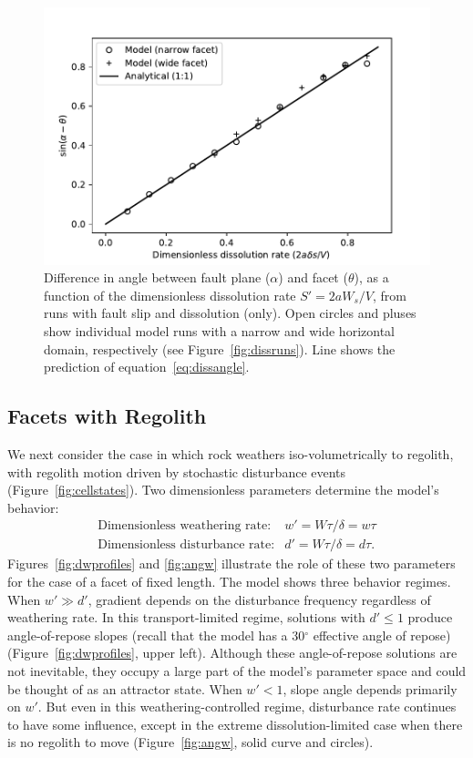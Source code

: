 \begin{figure}[ht!]
\centerline{\includegraphics{Figures/angle_vs_dissolution.pdf}}
\caption{Difference in angle between fault plane ($\alpha$) and facet ($\theta$), as a function of the dimensionless dissolution rate $S' = 2aW_s/V$, from runs with fault slip and dissolution (only). Open circles and pluses show individual model runs with a narrow and wide horizontal domain, respectively (see Figure~\ref{fig:dissruns}). Line shows the prediction of equation~\ref{eq:dissangle}.}
\label{fig:angdiss}
\end{figure}

\subsection{Facets with Regolith}

We next consider the case in which rock weathers iso-volumetrically to regolith, with regolith motion driven by stochastic disturbance events (Figure~\ref{fig:cellstates}). Two dimensionless parameters determine the model's behavior:
\begin{eqnarray*}
\textrm{Dimensionless weathering rate:} & w' = W\tau/\delta = w\tau \\
\textrm{Dimensionless disturbance rate:} & d' = W\tau/\delta = d\tau.
\end{eqnarray*}
Figures~\ref{fig:dwprofiles} and \ref{fig:angw} illustrate the role of these two parameters for the case of a facet of fixed length. The model shows three behavior regimes. When $w'\gg d'$, gradient depends on the disturbance frequency regardless of weathering rate. In this transport-limited regime, solutions with $d'\le 1$ produce angle-of-repose slopes (recall that the model has a 30$^\circ$ effective angle of repose) (Figure~\ref{fig:dwprofiles}, upper left). Although these angle-of-repose solutions are not inevitable, they occupy a large part of the model's parameter space and could be thought of as an attractor state. When $w' < 1$, slope angle depends primarily on $w'$. But even in this weathering-controlled regime, disturbance rate continues to have some influence, except in the extreme dissolution-limited case when there is no regolith to move (Figure~\ref{fig:angw}, solid curve and circles). 

